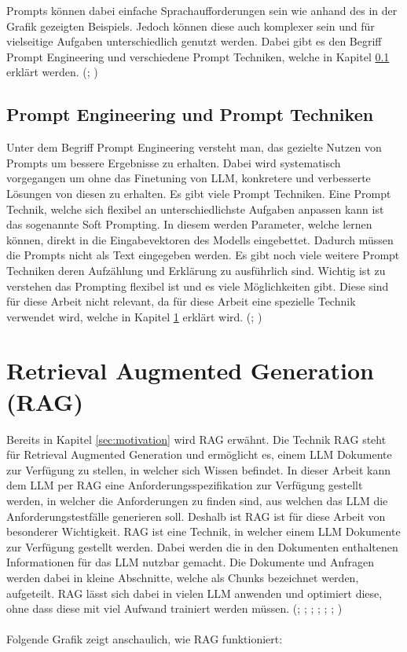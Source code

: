 \documentclass[12pt,toc=bib,toc=listof]{scrreprt}
\begin{document}
\noindent Prompts können dabei einfache Sprachaufforderungen sein wie anhand des in der Grafik gezeigten Beispiels. Jedoch können diese auch komplexer sein und für vielseitige Aufgaben unterschiedlich genutzt werden. Dabei gibt es den Begriff Prompt Engineering und verschiedene Prompt Techniken, welche in Kapitel \ref{sec:promptEngineeringUndPromptTechniken} erklärt werden. (\cite{Gu2023}; \cite{Liu2023})

\subsection{Prompt Engineering und Prompt Techniken} %
\label{sec:promptEngineeringUndPromptTechniken}
Unter dem Begriff Prompt Engineering versteht man, das gezielte Nutzen von Prompts um bessere Ergebnisse zu erhalten. Dabei wird systematisch vorgegangen um ohne das Finetuning von LLM, konkretere und verbesserte Lösungen von diesen zu erhalten. Es gibt viele Prompt Techniken. Eine Prompt Technik, welche sich flexibel an unterschiedlichste Aufgaben anpassen kann ist das sogenannte Soft Prompting. In diesem werden Parameter, welche lernen können, direkt in die Eingabevektoren des Modells eingebettet. Dadurch müssen die Prompts nicht als Text eingegeben werden. Es gibt noch viele weitere Prompt Techniken deren Aufzählung und Erklärung zu ausführlich sind. Wichtig ist zu verstehen das Prompting flexibel ist und es viele Möglichkeiten gibt. Diese sind für diese Arbeit nicht relevant, da für diese Arbeit eine spezielle Technik verwendet wird, welche in Kapitel \ref{sec:rag} erklärt wird. (\cite{Gu2023}; \cite{Liu2023})

\section{Retrieval Augmented Generation (RAG)} %
\label{sec:rag}
Bereits in Kapitel \ref{sec:motivation} wird RAG erwähnt. Die Technik RAG steht für Retrieval Augmented Generation und ermöglicht es, einem LLM Dokumente zur Verfügung zu stellen, in welcher sich Wissen befindet. In dieser Arbeit kann dem LLM per RAG eine Anforderungsspezifikation zur Verfügung gestellt werden, in welcher die Anforderungen zu finden sind, aus welchen das LLM die Anforderungstestfälle generieren soll. Deshalb ist RAG ist für diese Arbeit von besonderer Wichtigkeit. RAG ist eine Technik, in welcher einem LLM Dokumente zur Verfügung gestellt werden. Dabei werden die in den Dokumenten enthaltenen Informationen für das LLM nutzbar gemacht. Die Dokumente und Anfragen werden dabei in kleine Abschnitte, welche als Chunks bezeichnet werden, aufgeteilt. RAG lässt sich dabei in vielen LLM anwenden und optimiert diese, ohne dass diese mit viel Aufwand trainiert werden müssen. (\cite{Gao2024}; \cite{Honroth2024}; \cite{Lewis2021}; \cite{Miesle2023}; \cite{Salemi2024}; \cite{Schmid2024}; \cite{Wu2024})\\
\\
Folgende Grafik zeigt anschaulich, wie RAG funktioniert:
\end{document}
